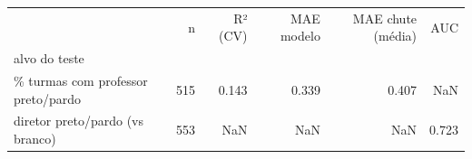 \begin{tabular}{lrrrrr}
\toprule
 & n & R² (CV) & MAE modelo & MAE chute (média) & AUC \\
alvo do teste &  &  &  &  &  \\
\midrule
\% turmas com professor preto/pardo & 515 & 0.143 & 0.339 & 0.407 & NaN \\
diretor preto/pardo (vs branco) & 553 & NaN & NaN & NaN & 0.723 \\
\bottomrule
\end{tabular}
